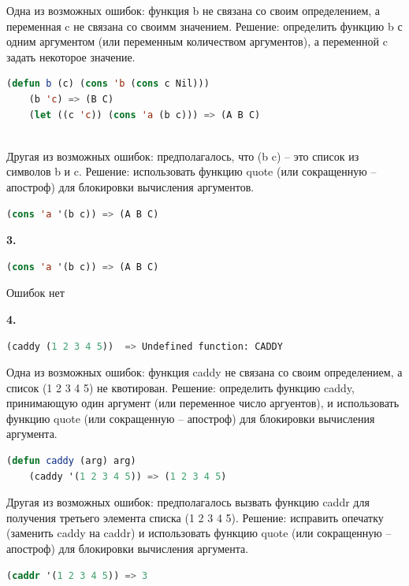 \documentclass[12pt]{report}
\begin{document}
Одна из возможных ошибок: функция b не связана со своим определением, а переменная c не связана со своимм значением. Решение: определить функцию b с одним аргументом (или переменным количеством аргументов), а переменной c задать некоторое значение.
\begin{lstlisting}[language=Lisp]
	(defun b (c) (cons 'b (cons c Nil)))
	(b 'c) => (B C)
	(let ((c 'c)) (cons 'a (b c))) => (A B C)
	
\end{lstlisting}

Другая из возможных ошибок: предполагалось, что (b c) -- это список из символов b и c. Решение: использовать функцию quote (или сокращенную -- апостроф) для блокировки вычисления аргументов.
\begin{lstlisting}[language=Lisp]
	(cons 'a '(b c)) => (A B C)
\end{lstlisting}






\textbf{3.} 
\begin{lstlisting}[language=Lisp]
	(cons 'a '(b c)) => (A B C)
\end{lstlisting}
Ошибок нет





\textbf{4.} 

\begin{lstlisting}[language=Lisp]
	(caddy (1 2 3 4 5))  => Undefined function: CADDY
\end{lstlisting}

Одна из возможных ошибок: функция caddy не связана со своим определением, а список (1 2 3 4 5) не квотирован. Решение: определить функцию caddy, принимающую один аргумент  (или переменное число аргуентов), и использовать функцию quote (или сокращенную -- апостроф) для блокировки вычисления аргумента.
\begin{lstlisting}[language=Lisp]
	(defun caddy (arg) arg)
	(caddy '(1 2 3 4 5)) => (1 2 3 4 5)
\end{lstlisting}

Другая из возможных ошибок: предполагалось вызвать функцию caddr для получения третьего элемента списка (1 2 3 4 5). Решение: исправить опечатку (заменить caddy на caddr) и использовать функцию quote (или сокращенную -- апостроф) для блокировки вычисления аргумента.
\begin{lstlisting}[language=Lisp]
	(caddr '(1 2 3 4 5)) => 3
\end{lstlisting}
\end{document}
